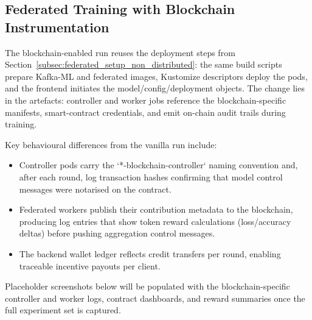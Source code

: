 \subsection{Federated Training with Blockchain Instrumentation}
\label{subsec:fed_blockchain_setup}

The blockchain-enabled run reuses the deployment steps from Section~\ref{subsec:federated_setup_non_distributed}: the same build scripts prepare Kafka-ML and federated images, Kustomize descriptors deploy the pods, and the frontend initiates the model/config/deployment objects. The change lies in the artefacts: controller and worker jobs reference the blockchain-specific manifests, smart-contract credentials, and emit on-chain audit trails during training.

Key behavioural differences from the vanilla run include:

\begin{itemize}
    \item Controller pods carry the `*-blockchain-controller` naming convention and, after each round, log transaction hashes confirming that model control messages were notarised on the contract.
    \item Federated workers publish their contribution metadata to the blockchain, producing log entries that show token reward calculations (loss/accuracy deltas) before pushing aggregation control messages.
    \item The backend wallet ledger reflects credit transfers per round, enabling traceable incentive payouts per client.
\end{itemize}

Placeholder screenshots below will be populated with the blockchain-specific controller and worker logs, contract dashboards, and reward summaries once the full experiment set is captured.

